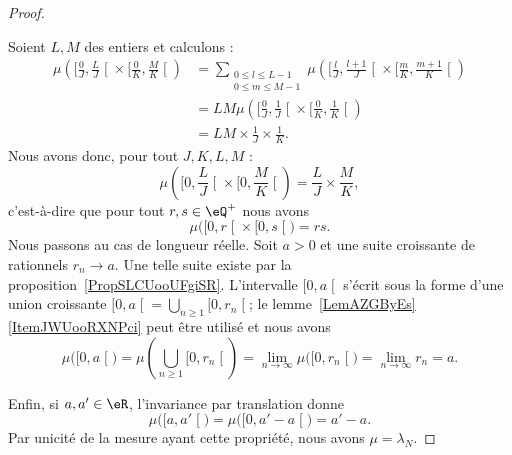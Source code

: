 \begin{proof}
\begin{subproof}
		Soient \( L,M\) des entiers et calculons :
		\begin{subequations}
			\begin{align}
				\mu\left( \mathopen[ \frac{ 0 }{ J } , \frac{ L }{ J } \mathclose[\times \mathopen[ \frac{ 0 }{ K } , \frac{ M }{ K } \mathclose[ \right) & =\sum_{\substack{0\leq l\leq L-1                                                                                                               \\0\leq m\leq M-1}}\mu\left(   \mathopen[    \frac{ l }{ J },\frac{ l+1 }{ J }  \mathclose[\times \mathopen[ \frac{ m }{ K } , \frac{ m+1 }{ K } \mathclose[      \right)\\
				                                                                                                                                          & =LM\mu\left(  \mathopen[ \frac{ 0 }{ J } , \frac{ 1 }{ J } \mathclose[\times \mathopen[ \frac{ 0 }{ K } , \frac{ 1 }{ K } \mathclose[  \right) \\
				                                                                                                                                          & =LM\times \frac{1}{ J }\times \frac{1}{ K }.
			\end{align}
		\end{subequations}
		Nous avons donc, pour tout \( J,K,L,M\) :
		\begin{equation}
			\mu\left( \mathopen[ 0 , \frac{ L }{ J } \mathclose[\times \mathopen[ 0, \frac{ M }{ K } \mathclose[ \right)=\frac{ L }{ J }\times \frac{ M }{ K },
		\end{equation}
		c'est-à-dire que pour tout \( r,s\in \eQ^+\) nous avons
		\begin{equation}
			\mu\big(   \mathopen[ 0 , r \mathclose[\times \mathopen[ 0 , s \mathclose[ \big)=rs.
		\end{equation}
		Nous passons au cas de longueur réelle. Soit \( a>0\) et une suite croissante de rationnels \( r_n\to a\). Une telle suite existe par la proposition~\ref{PropSLCUooUFgiSR}. L'intervalle \( \mathopen[ 0 , a \mathclose[\) s'écrit sous la forme d'une union croissante \( \mathopen[ 0 , a \mathclose[=\bigcup_{n\geq 1}\mathopen[ 0 , r_n \mathclose[\); le lemme~\ref{LemAZGByEs}\ref{ItemJWUooRXNPci} peut être utilisé et nous avons
		\begin{equation}
			\mu\big( \mathopen[ 0 , a \mathclose[ \big)=\mu\left( \bigcup_{n\geq 1}\mathopen[ 0 , r_n \mathclose[ \right)=\lim_{n\to \infty} \mu\big( \mathopen[ 0 , r_n \mathclose[ \big)=\lim_{n\to \infty} r_n=a.
		\end{equation}
	\end{subproof}

	Enfin, si \( a,a'\in \eR\), l'invariance par translation donne
	\begin{equation}
		\mu\big( \mathopen[ a , a' \mathclose[ \big)=\mu\big( \mathopen[ 0 , a'-a \mathclose[ \big)=a'-a.
	\end{equation}
	Par unicité de la mesure ayant cette propriété, nous avons \( \mu=\lambda_N\).
\end{proof}

